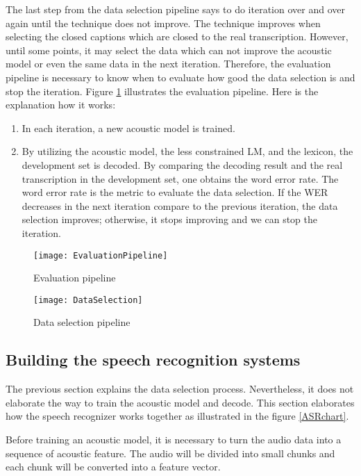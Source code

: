 The last step from the data selection pipeline says to do iteration over and over again until the technique does not improve. The technique improves when selecting the closed captions which are closed to the real transcription. However, until some points, it may select the data which can not improve the acoustic model or even the same data in the next iteration. Therefore, the evaluation pipeline is necessary to know when to evaluate how good the data selection is and stop the iteration. Figure \ref{evaluationPipeline} illustrates the evaluation pipeline. Here is the explanation how it works:
\begin{enumerate}
\item In each iteration, a new acoustic model is trained.
\item By utilizing the acoustic model, the less constrained LM, and the lexicon, the development set is decoded. By comparing the decoding result and the real transcription in the development set, one obtains the word error rate. The word error rate is the metric to evaluate the data selection. If the WER decreases in  the next iteration compare to the previous iteration, the data selection improves; otherwise, it stops improving and we can stop the iteration.
\end{enumerate}



\begin{figure}[H]
\caption{Evaluation pipeline}
\label{evaluationPipeline}
\texttt{[image: EvaluationPipeline]} 
\centering
\end{figure}


\begin{figure}[H]
\caption{Data selection pipeline}
\label{selectionPipeline}
\texttt{[image: DataSelection]} 
\centering
\end{figure}


\subsection{Building the speech recognition systems}
The previous section explains the data selection process. Nevertheless, it does not elaborate the way to train the acoustic model and decode. This section elaborates how the speech recognizer works together as illustrated in the figure \ref{ASRchart}.

Before training an acoustic model, it is necessary to turn the audio data into a sequence of acoustic feature. The audio will be divided into small chunks and each chunk will be converted into a feature vector. 

